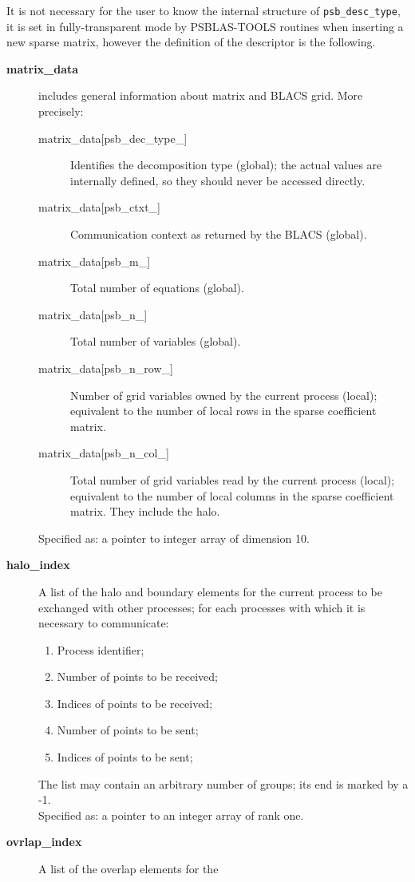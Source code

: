 It is not necessary for the user to
know the internal structure of \verb|psb_desc_type|, it is set in
fully-transparent mode by PSBLAS-TOOLS routines when inserting a new
sparse matrix, however the definition of the descriptor is the
following.  
\begin{description}
\item[{\bf matrix\_data}] includes general information about matrix and
BLACS grid. More precisely:
\begin{description}
\item[matrix\_data[psb\_dec\_type\_\hbox{]}] Identifies the decomposition type
(global); the actual values are internally defined, so they should
never be accessed directly.
\item[matrix\_data[psb\_ctxt\_\hbox{]}] Communication context as returned by the
BLACS (global).
\item[matrix\_data[psb\_m\_\hbox{]}] Total number of equations (global).
\item[matrix\_data[psb\_n\_\hbox{]}] Total number of variables (global).
\item[matrix\_data[psb\_n\_row\_\hbox{]}] Number of grid variables owned by the
current process (local); equivalent to the number of local rows in the
sparse coefficient matrix.
\item[matrix\_data[psb\_n\_col\_\hbox{]}] Total number of grid variables read by the
current process (local); equivalent to the number of local columns in
the sparse coefficient matrix. They include the halo.
\end{description}
Specified as: a pointer to integer array of dimension 10.
\item[{\bf halo\_index}] A list of the halo and boundary elements for
the current process to be exchanged with other processes; for each
processes with which it is necessary to communicate:
\begin{enumerate}
\item Process identifier;
\item Number of points to be received;
\item Indices of points to be received;
\item Number of points to be sent;
\item Indices of points to be sent;
\end{enumerate}
The list may contain an arbitrary number of groups; its end is marked
by a -1.\\
Specified as: a pointer to an integer array of rank one.
\item [{\bf ovrlap\_index}] A list of the overlap elements for the

\end{description}
